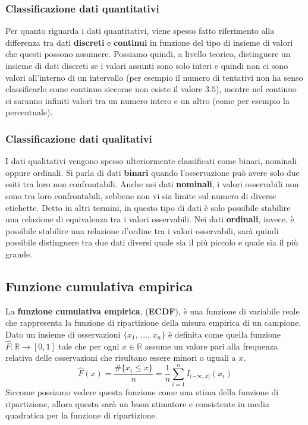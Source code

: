 \subsubsection{Classificazione dati quantitativi}
Per quanto riguarda i dati quantitativi, viene spesso fatto riferimento alla differenza tra dati \textbf{discreti} e \textbf{continui} in funzione del tipo di insieme di valori che questi possono assumere. Possiamo quindi, a livello teorico, distinguere un insieme di dati discreti se i valori assunti sono solo interi e quindi non ci sono valori all'interno di un intervallo (per esempio il numero di tentativi non ha senso classificarlo come continuo siccome non esiste il valore $3.5$), mentre nel continuo ci saranno infiniti valori tra un numero intero e un altro (come per esempio la percentuale).

\subsubsection{Classificazione dati qualitativi}
I dati qualitativi vengono spesso ulteriormente classificati come binari, nominali oppure
ordinali. Si parla di dati \textbf{binari} quando l’osservazione può avere solo due esiti tra loro
non confrontabili. Anche nei dati \textbf{nominali}, i valori osservabili non sono tra loro confrontabili, sebbene non vi sia limite sul numero di diverse etichette.  Detto in altri termini, in questo tipo di dati è solo possibile stabilire una relazione di equivalenza tra i valori osservabili. Nei dati \textbf{ordinali}, invece, è possibile stabilire una relazione d’ordine tra i valori osservabili, sarà quindi possibile distinguere tra due dati diversi quale sia il più piccolo e quale sia il più grande.


\subsection{Funzione cumulativa empirica}
La \textbf{funzione cumulativa empirica}, (\textbf{ECDF}), è una funzione di variabile reale che rappresenta la funzione di ripartizione della misura empirica di un campione. Dato un insieme di osservazioni $\{x_1, \, ..., \, x_n\}$ è definita come quella funzione $\hat{F}: \mathbb R \rightarrow [0, 1]$ tale che per ogni $x \in \mathbb R$ assume un valore pari alla frequenza relativa delle osservazioni che risultano essere minori o uguali a $x$.
$$
\hat{F}(x) = \dfrac{\# \{x_i \leq x\}}{n} = \dfrac{1}{n} \sum_{i = 1}^n I_{(- \infty, x]}(x_i)
$$
Siccome possiamo vedere questa funzione come una stima della funzione di ripartizione, allora questa sarà un buon stimatore e consistente in media quadratica per la funzione di ripartizione.

